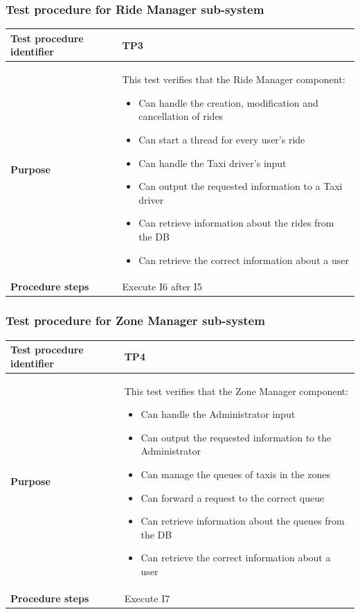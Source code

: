 \documentclass[a4paper,11pt]{report} %
\begin{document}
			\subsubsection{Test procedure for Ride Manager sub-system} \label{sec:3.2.3}
				\begin{center}
					\begin{tabular}{| l | p{10cm} |}\hline
						\textbf{Test procedure identifier} & TP3\\\hline
						\textbf{Purpose} & This test verifies that the Ride Manager component: \begin{itemize}
							\item Can handle the creation, modification and cancellation of rides
							\item Can start a thread for every user's ride
							\item Can handle the Taxi driver's input
							\item Can output the requested information to a Taxi driver
							\item Can retrieve information about the rides from the DB
							\item Can retrieve the correct information about a user
						\end{itemize}\\\hline
						\textbf{Procedure steps} & Execute I6 after I5 \\\hline
					\end{tabular}
				\end{center}
			
		\pagebreak				
			\subsubsection{Test procedure for Zone Manager sub-system} \label{sec:3.2.4}
				\begin{center}
					\begin{tabular}{| l | p{10cm} |}\hline
						\textbf{Test procedure identifier} & TP4\\\hline
						\textbf{Purpose} & This test verifies that the Zone Manager component: \begin{itemize}
							\item Can handle the Administrator input		
							\item Can output the requested information to the Administrator										
							\item Can manage the queues of taxis in the zones
							\item Can forward a request to the correct queue
							\item Can retrieve information about the queues from the DB
							\item Can retrieve the correct information about a user
						\end{itemize}\\\hline
						\textbf{Procedure steps} & Execute I7 \\\hline
					\end{tabular}
				\end{center}
		\pagebreak				
\end{document}
